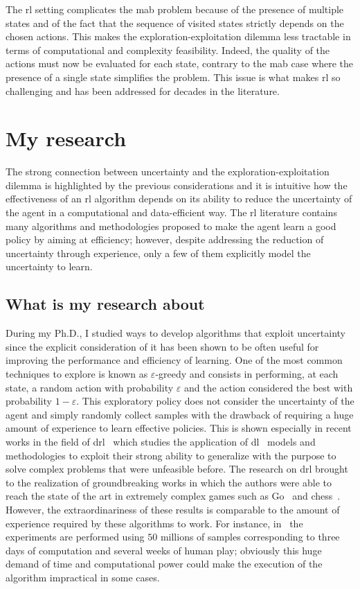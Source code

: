 The \gls{rl} setting complicates the \gls{mab} problem because of the presence of multiple states and of the fact that the sequence of visited states strictly depends on the chosen actions. This makes the exploration-exploitation dilemma less tractable in terms of computational and complexity feasibility. Indeed, the quality of the actions must now be evaluated for each state, contrary to the \gls{mab} case where the presence of a single state simplifies the problem. This issue is what makes \gls{rl} so challenging and has been addressed for decades in the literature.

\section{My research}
The strong connection between uncertainty and the exploration-exploitation dilemma is highlighted by the previous considerations and it is intuitive how the effectiveness of an \gls{rl} algorithm depends on its ability to reduce the uncertainty of the agent in a computational and data-efficient way. The \gls{rl} literature contains many algorithms and methodologies proposed to make the agent learn a good policy by aiming at efficiency; however, despite addressing the reduction of uncertainty through experience, only a few of them explicitly model the uncertainty to learn.

\subsection{What is my research about}
During my Ph.D., I studied ways to develop algorithms that exploit uncertainty since the explicit consideration of it has been shown to be often useful for improving the performance and efficiency of learning. One of the most common techniques to explore is known as $\varepsilon$-greedy and consists in performing, at each state, a random action with probability $\varepsilon$ and the action considered the best with probability $1 - \varepsilon$. This exploratory policy does not consider the uncertainty of the agent and simply randomly collect samples with the drawback of requiring a huge amount of experience to learn effective policies. This is shown especially in recent works in the field of \gls{drl}~\cite{mnih2015human, van2016deep, wang2015dueling} which studies the application of \gls{dl}~\cite{lecun2015deep} models and methodologies to exploit their strong ability to generalize with the purpose to solve complex problems that were unfeasible before. The research on \gls{drl} brought to the realization of groundbreaking works in which the authors were able to reach the state of the art in extremely complex games such as Go~\cite{silver2016mastering, silver2017mastering} and chess~\cite{silver2017chess}.
However, the extraordinariness of these results is comparable to the amount of experience required by these algorithms to work. For instance, in~\cite{mnih2015human} the experiments are performed using $50$ millions of samples corresponding to three days of computation and several weeks of human play; obviously this huge demand of time and computational power could make the execution of the algorithm impractical in some cases.

